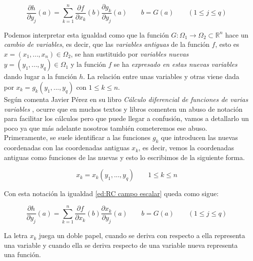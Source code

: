          \begin{equation}\label{ed:RC campo escalar}
             \frac{\partial h}{\partial y_j}(a) = \sum_{k=1}^{n} \frac{\partial f}{\partial x_k}(b)\frac{\partial g_k}{\partial y_j}(a) \qquad b = G(a) \qquad (1 \leq j \leq q )
         \end{equation}
         
        \noindent Podemos interpretar esta igualdad como que la función $G:\Omega_1 \rightarrow \Omega_2 \subset \mathbb{R}^n$  hace un \textit{cambio de variables}, es decir, que las \textit{variables antiguas}  de la función $f$, esto es $x=(x_1,...,x_n) \in \Omega_2$, se han sustituido por \textit{variables nuevas} $y=(y_1,...,y_q) \in \Omega_1$ y la función $f$ se ha \textit{expresado en estas nuevas variables} dando lugar a la función $h$. La relación entre unas variables y otras viene dada por $x_k = g_k(y_1,...,y_q)$ con $1 \leq k \leq n$. \\  
         
         Según comenta Javier Pérez en su libro \textit{Cálculo diferencial de funciones de varias variables} \cite{FJP}, ocurre que en muchos textos y libros comenten un abuso de notación para facilitar los cálculos pero que puede llegar a confusión, vamos a detallarlo un poco ya que más adelante nosotros también cometeremos ese abuso. Primeramente, se suele identificar a las funciones $g_k$ que introducen las nuevas coordenadas con las coordenadas antiguas $x_k$, es decir, vemos la coordenadas antiguas como funciones de las nuevas y esto lo escribimos de la siguiente forma.
         
         \begin{equation}
             x_k = x_k(y_1,...,y_q) \qquad 1 \leq k \leq n
         \end{equation}
         
         \noindent Con esta notación la igualdad \eqref{ed:RC campo escalar} queda como sigue:
         
         \begin{equation}
             \frac{\partial h}{\partial y_j}(a) = \sum_{k=1}^{n} \frac{\partial f}{\partial x_k}(b)\frac{\partial x_k}{\partial y_j}(a) \qquad b = G(a) \qquad (1 \leq j \leq q )
         \end{equation}
         
         \noindent La letra $x_k$ juega un doble papel, cuando se deriva con respecto a ella representa una variable y cuando ella se deriva respecto de una variable nueva representa una función. \\
         
